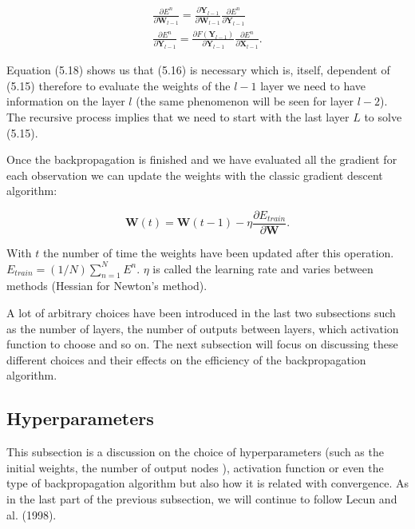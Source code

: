 \documentclass[a4paper,12pt]{article}
\numberwithin{equation}{section}
\begin{document}
\begin{align}\label{eq:14}
\frac{\partial E^n}{\partial \boldsymbol{W}_{l-1}} = \frac{\partial \boldsymbol{Y}_{l-1}}{\partial \boldsymbol{W}_{l-1}} \frac{\partial E^n}{\partial\boldsymbol{Y}_{l-1}} \\
\frac{\partial E^n}{\partial \boldsymbol{Y}_{l-1}} = \frac{\partial F(\boldsymbol{Y}_{l-1})}{\partial \boldsymbol{Y}_{l-1}} \frac{\partial E^n}{\partial\boldsymbol{X}_{l-1}}.
\end{align}

Equation (5.18) shows us that (5.16) is necessary which is, itself, dependent of (5.15) therefore to evaluate the weights of the $l-1$ layer we need to have information on the layer $l$ (the same phenomenon will be seen for layer $l-2$). The recursive process implies that we need to start with the last layer $L$ to solve (5.15). 

Once the backpropagation is finished and we have evaluated all the gradient for each observation we can update the weights with the classic gradient descent algorithm:

\begin{equation}\label{eq:15}
\boldsymbol{W}(t) = \boldsymbol{W}(t-1) - \eta\frac{\partial E_{train}}{\partial \boldsymbol{W}}.
\end{equation}

With $t$ the number of time the weights have been updated after this operation. $E_{train} = (1/N)\sum_{n=1}^NE^n$. $\eta$ is called the learning rate and varies between methods (Hessian for Newton's method). 

A lot of arbitrary choices have been introduced in the last two subsections such as the number of layers, the number of outputs between layers, which activation function to choose and so on. The next subsection will focus on discussing these different choices and their effects on the efficiency of the backpropagation algorithm.

\subsection{Hyperparameters}

This subsection is a discussion on the choice of hyperparameters (such as the initial weights, the number of output nodes ), activation function or even the type of backpropagation algorithm but also how it is related with convergence. As in the last part of the previous subsection, we will continue to follow Lecun and al. (1998). 
\end{document}
